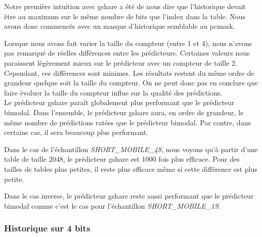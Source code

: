 \documentclass{article}
\begin{document}
Notre première intuition avec gshare a été de nous dire que l'historique devait être au maximum sur le même nombre de bits que l'index dans la table. Nous avons donc commencés avec un masque d'historique semblable au pcmask. 

Lorsque nous avons fait varier la taille du compteur (entre 1 et 4), nous n'avons pas remarqué de réelles différences entre les prédicteurs. Certaines valeurs nous paraissent légèrement mieux sur le prédicteur avec un compteur de taille 2. Cependant, ces différences sont minimes. Les résultats restent du même ordre de grandeur quelque soit la taille du compteur. On ne peut donc pas en conclure que faire évoluer la taille du compteur influe sur la qualité des prédictions. \\

Le prédicteur gshare paraît globalement plus performant que le prédicteur bimodal. Dans l'ensemble, le prédicteur gshare aura, en ordre de grandeur, le même nombre de prédictions ratées que le prédicteur bimodal. Par contre, dans certains cas, il sera beaucoup plus performant.

Dans le cas de l'échantillon \textit{SHORT\_MOBILE\_48}, nous voyons qu'à partir d'une table de taille 2048, le prédicteur gshare est 1000 fois plus efficace. Pour des tailles de tables plus petites, il reste plus efficace même si cette différence est plus petite. 

Dans le cas inverse, le prédicteur gshare reste aussi performant que le prédicteur bimodal comme c'est le cas pour l'échantillon \textit{SHORT\_MOBILE\_19}.

\subsubsection{Historique sur 4 bits}
\end{document}
